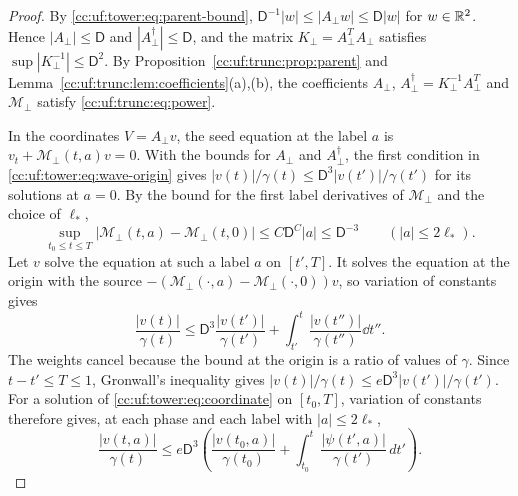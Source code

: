 \begin{proof}
By \eqref{cc:uf:tower:eq:parent-bound},
$\mathsf D^{-1}|w|\le|A_\perp w|\le\mathsf D|w|$ for $w\in\mathbb R^2$. Hence
$|A_\perp|\le\mathsf D$ and $|A_\perp^\dagger|\le\mathsf D$, and the
matrix $K_\perp=A_\perp^TA_\perp$ satisfies
$\sup|K_\perp^{-1}|\le\mathsf D^2$. By
Proposition~\ref{cc:uf:trunc:prop:parent} and
Lemma~\ref{cc:uf:trunc:lem:coefficients}(a),(b), the coefficients
$A_\perp$, $A_\perp^\dagger=K_\perp^{-1}A_\perp^T$ and $\mathcal M_\perp$
satisfy \eqref{cc:uf:trunc:eq:power}.

In the coordinates $V=A_\perp v$, the seed equation at the label $a$ is
$v_t+\mathcal M_\perp(t,a)v=0$. With the bounds for $A_\perp$ and
$A_\perp^\dagger$, the first condition
in \eqref{cc:uf:tower:eq:wave-origin} gives
$|v(t)|/\gamma(t)\le\mathsf D^3|v(t')|/\gamma(t')$ for its solutions at
$a=0$. By the bound for the first label
derivatives of $\mathcal M_\perp$ and the choice of $\ell_*$,
\[
 \sup_{t_0\le t\le T}
 |\mathcal M_\perp(t,a)-\mathcal M_\perp(t,0)|
 \le C\mathsf D^C|a|\le\mathsf D^{-3}\qquad(|a|\le2\ell_*).
\]
Let $v$ solve the equation at such a label $a$ on $[t',T]$. It solves
the equation at the origin with
the source $-(\mathcal M_\perp(\cdot,a)-\mathcal M_\perp(\cdot,0))v$, so
variation of constants gives
\[
 \frac{|v(t)|}{\gamma(t)}
 \le\mathsf D^3\frac{|v(t')|}{\gamma(t')}
 +\int_{t'}^t\frac{|v(t'')|}{\gamma(t'')}\dd t''.
\]
The weights cancel because the bound at the origin is a ratio of values
of $\gamma$. Since $t-t'\le T\le1$, Gronwall's inequality gives
$|v(t)|/\gamma(t)\le e\mathsf D^3|v(t')|/\gamma(t')$. For a solution of
\eqref{cc:uf:tower:eq:coordinate} on $[t_0,T]$, variation of constants
therefore gives, at each phase and each label with $|a|\le2\ell_*$,
\begin{equation}\label{cc:uf:tower:eq:weighted-forward}
 \frac{|v(t,a)|}{\gamma(t)}
 \le e\mathsf D^3\left(
 \frac{|v(t_0,a)|}{\gamma(t_0)}
 +\int_{t_0}^t\frac{|\psi(t',a)|}{\gamma(t')}\,dt'\right).
\end{equation}


\end{proof}
